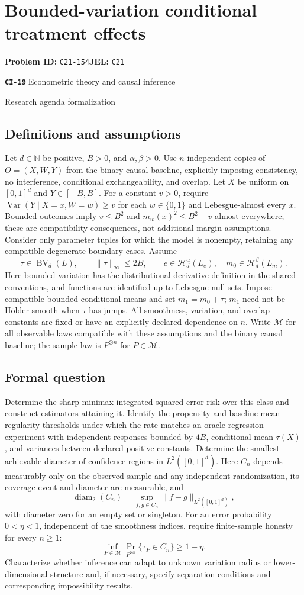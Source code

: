 \documentclass[11pt,a4paper]{article}
\newcommand{\N}{\mathbb N}
\newcommand{\Var}{\operatorname{Var}}
\newcommand{\entrymeta}[3]{{\sffamily\small\color{muted}\textbf{\texttt{#1}}\quad|\quad #2\par #3\par}}
\begin{document}
\section*{Bounded-variation conditional treatment effects}
\textbf{Problem ID:} \texttt{C21-154}\quad \textbf{JEL:} \texttt{C21}\par
\label{problem:OP-0498}
\label{beyond:CI-19}
\entrymeta{CI-19}{Econometric theory and causal inference}{Research agenda formalization}
\subsection*{Definitions and assumptions}
Let $d\in\N$ be positive, $B>0$, and $\alpha,\beta>0$. Use $n$ independent copies of $O=(X,W,Y)$ from the binary causal baseline, explicitly imposing consistency, no interference, conditional exchangeability, and overlap. Let $X$ be uniform on $[0,1]^d$ and $Y\in[-B,B]$. For a constant $v>0$, require $\Var(Y\mid X=x,W=w)\geq v$ for each $w\in\{0,1\}$ and Lebesgue-almost every $x$. Bounded outcomes imply $v\leq B^2$ and $m_w(x)^2\leq B^2-v$ almost everywhere; these are compatibility consequences, not additional margin assumptions. Consider only parameter tuples for which the model is nonempty, retaining any compatible degenerate boundary cases. Assume
\[
\tau\in\operatorname{BV}_d(L),\qquad
\|\tau\|_\infty\leq2B,\qquad
e\in\mathcal H_d^\alpha(L_e),\quad
m_0\in\mathcal H_d^\beta(L_m).
\]
Here bounded variation has the distributional-derivative definition in the shared conventions, and functions are identified up to Lebesgue-null sets. Impose compatible bounded conditional means and set $m_1=m_0+\tau$; $m_1$ need not be Hölder-smooth when $\tau$ has jumps. All smoothness, variation, and overlap constants are fixed or have an explicitly declared dependence on $n$. Write $\mathcal M$ for all observable laws compatible with these assumptions and the binary causal baseline; the sample law is $P^{\otimes n}$ for $P\in\mathcal M$.
\subsection*{Formal question}
Determine the sharp minimax integrated squared-error risk over this class and construct estimators attaining it. Identify the propensity and baseline-mean regularity thresholds under which the rate matches an oracle regression experiment with independent responses bounded by $4B$, conditional mean $\tau(X)$, and variances between declared positive constants. Determine the smallest achievable diameter of confidence regions in $L^2([0,1]^d)$. Here $C_n$ depends measurably only on the observed sample and any independent randomization, its coverage event and diameter are measurable, and
\[
\operatorname{diam}_2(C_n)=\sup_{f,g\in C_n}\|f-g\|_{L^2([0,1]^d)},
\]
with diameter zero for an empty set or singleton. For an error probability $0<\eta<1$, independent of the smoothness indices, require finite-sample honesty for every $n\geq1$:
\[
\inf_{P\in\mathcal M}\Pr_{P^{\otimes n}}\{\tau_P\in C_n\}\geq1-\eta.
\]
Characterize whether inference can adapt to unknown variation radius or lower-dimensional structure and, if necessary, specify separation conditions and corresponding impossibility results.
\end{document}

